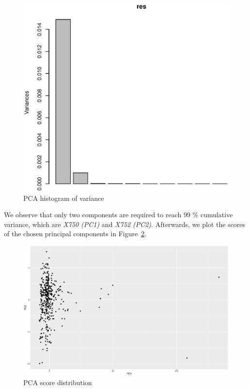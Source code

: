 \documentclass[a4paper,12pt]{article}
\begin{document}
        \begin{figure}[H]
            \centering
            \caption{PCA histogram of variance}
            \label{fig:pcahist}
            \includegraphics[width=\textwidth]{share/A2_pcahist.eps}
        \end{figure}

        We observe that only two components are required to reach 99 \% cumulative variance, which are \emph{X750 (PC1)} and \emph{X752 (PC2)}. Afterwards, we plot the scores of the chosen principal components in Figure~\ref{fig:pcascore}.

        \begin{figure}[H]
            \centering
            \caption{PCA score distribution}
            \label{fig:pcascore}
            \includegraphics[width=\textwidth]{share/A2_pcascore.eps}
        \end{figure}
\end{document}
